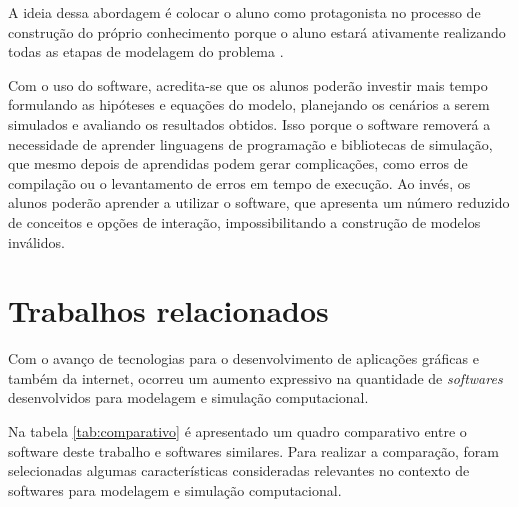 \documentclass[
	12pt,				%
	openright,			%
	oneside,			%
	a4paper,			%
	main=brazil,
	english,			%
	]{ufsj-abntex2}
\begin{document}
A ideia dessa abordagem é colocar o aluno como protagonista no processo de construção do próprio conhecimento porque o aluno estará ativamente realizando todas as etapas de modelagem do problema \cite{Akcay2009, Eleonora2022}. 

Com o uso do software, acredita-se que os alunos poderão investir mais tempo formulando as hipóteses e equações do modelo, planejando os cenários a serem simulados e avaliando os resultados obtidos. Isso porque o software removerá a necessidade de aprender linguagens de programação e bibliotecas de simulação, que mesmo depois de aprendidas podem gerar complicações, como erros de compilação ou o levantamento de erros em tempo de execução. Ao invés, os alunos poderão aprender a utilizar o software, que apresenta um número reduzido de conceitos e opções de interação, impossibilitando a construção de modelos inválidos.

\chapter{Trabalhos relacionados}
\label{chap:relacionados}

Com o avanço de tecnologias para o desenvolvimento de aplicações gráficas e também da internet, ocorreu um aumento expressivo na quantidade de \textit{softwares} desenvolvidos para modelagem e simulação computacional. 

Na tabela \ref{tab:comparativo} é apresentado um quadro comparativo entre o software deste trabalho e softwares similares. Para realizar a comparação, foram selecionadas algumas características consideradas relevantes no contexto de softwares para modelagem e simulação computacional. 
\end{document}
